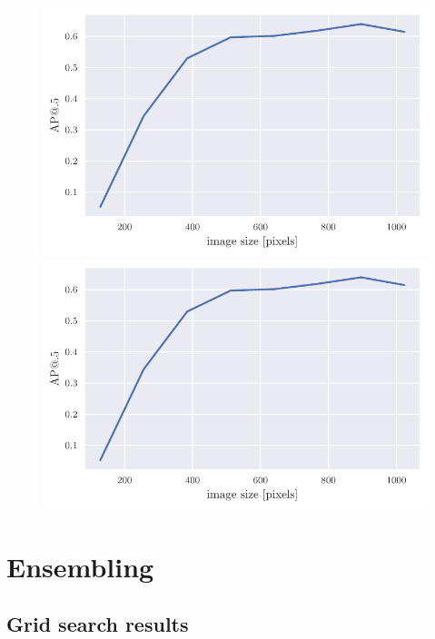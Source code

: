 \begin{figure}
    \begin{floatrow}[2]
        \includegraphics[width=0.5\linewidth]{images/img_size_dependency.pdf}\qquad
        \includegraphics[width=0.5\linewidth]{images/img_size_dependency.pdf}\qquad
    \end{floatrow}
\end{figure}

\section{Ensembling}
\subsection{Grid search results}

